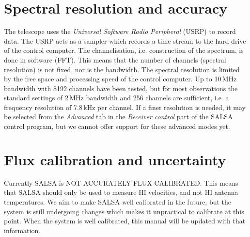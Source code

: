 \section{Spectral resolution and accuracy}
The telescope uses the \emph{Universal Software Radio Peripheral} (USRP) to
record data. The USRP acts as a sampler which records a time stream to the hard
drive of the control computer. The channelisation, i.e. construction of the
spectrum, is done in software (FFT). This means that the number of channels
(spectral resolution) is not fixed, nor is the bandwidth. The spectral
resolution is limited by the free space and processing speed of the control
computer. Up to 10\,MHz bandwidth with 8192 channels have been tested, but for
most observations the standard settings of 2\,MHz bandwidth and 256 channels
are sufficient, i.e. a frequency resolution of 7.8\,kHz per channel. If a finer
resolution is needed, it may be selected from the \emph{Advanced} tab in the
\emph{Receiver control} part of the SALSA control program, but we cannot offer
support for these advanced modes yet.

\section{Flux calibration and uncertainty}
Currently SALSA is NOT ACCURATELY FLUX CALIBRATED. This means that SALSA should
only be used to measure HI velocities, and not HI antenna temperatures. We aim
to make SALSA well calibrated in the future, but the system is still undergoing
changes which makes it unpractical to calibrate at this point. When the system
is well calibrated, this manual will be updated with that information.
